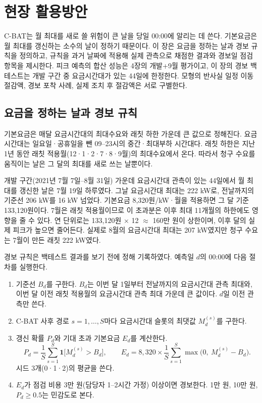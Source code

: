\section{현장 활용방안}

C-BAT는 월 최대를 새로 쓸 위험이 큰 날을 당일 00:00에 알리는 데 쓴다. 기본요금은 월 최대를 갱신하는 소수의 날이 정하기 때문이다. 이 장은 요금을 정하는 날과 경보 규칙을 정의하고, 규칙을 과거 날짜에 적용해 실제 관측으로 채점한 결과와 경보일 점검 항목을 제시한다. 피크 예측의 합산 성능은 4장의 개발+9월 평가이고, 이 장의 경보 백테스트는 개발 구간 중 요금시간대가 있는 44일에 한정한다. 모형의 반사실 일정 이동 절감액, 경보 포착 사례, 실제 조치 후 절감액은 서로 구별한다.

\subsection{요금을 정하는 날과 경보 규칙}

기본요금은 매달 요금시간대의 최대수요와 래칫 하한 가운데 큰 값으로 정해진다. 요금시간대는 일요일·공휴일을 뺀 09--23시의 중간·최대부하 시간대다. 래칫 하한은 지난 1년 동안 래칫 적용월(12·1·2·7·8·9월)의 최대수요에서 온다. 따라서 청구 수요를 움직이는 날은 그 달의 최대를 새로 쓰는 날뿐이다.

개발 구간(2021년 7월 7일--8월 31일) 가운데 요금시간대 관측이 있는 44일에서 월 최대를 갱신한 날은 7월 19일 하루였다. 그날 요금시간대 최대는 222 kW로, 전날까지의 기준선 206 kW를 16 kW 넘었다. 기본요금 8,320원/kW·월을 적용하면 그 달 기준 133,120원이다. 7월은 래칫 적용월이므로 이 초과분은 이후 최대 11개월의 하한에도 영향을 줄 수 있다. 연 단위로는 133,120원 $\times$ 12 $\approx$ 160만 원이 상한이며, 이후 달의 실제 피크가 높으면 줄어든다. 실제로 8월의 요금시간대 최대는 207 kW였지만 청구 수요는 7월이 만든 래칫 222 kW였다.

경보 규칙은 백테스트 결과를 보기 전에 정해 기록하였다. 예측일 $d$의 00:00에 다음 절차를 실행한다.
\begin{enumerate}
\item 기준선 $B_d$를 구한다. $B_d$는 이번 달 1일부터 전날까지의 요금시간대 관측 최대와, 이번 달 이전 래칫 적용월의 요금시간대 관측 최대 가운데 큰 값이다. $d$일 이전 관측만 쓴다.
\item C-BAT 사후 경로 $s=1,\dots,S$마다 요금시간대 슬롯의 최댓값 $M_d^{(s)}$를 구한다.
\item 갱신 확률 $P_d$와 기대 초과 기본요금 $E_d$를 계산한다.
\begin{equation}
P_d = \frac{1}{S}\sum_{s=1}^{S} \mathbf{1}\bigl[M_d^{(s)} > B_d\bigr], \qquad
E_d = 8{,}320 \times \frac{1}{S}\sum_{s=1}^{S} \max\bigl(0,\ M_d^{(s)} - B_d\bigr).
\end{equation}
시드 3개(0·1·2)의 평균을 쓴다.
\item $E_d$가 점검 비용 3만 원(담당자 1--2시간 가정) 이상이면 경보한다. 1만 원, 10만 원, $P_d \ge 0.5$는 민감도로 본다.
\end{enumerate}

